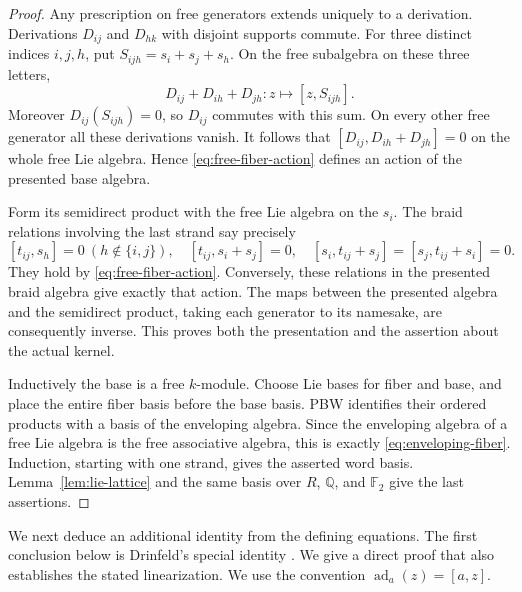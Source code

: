 \documentclass[11pt]{article}
\theoremstyle{definition}
\theoremstyle{remark}
\numberwithin{equation}{section}
\begin{document}
\begin{proof}
Any prescription on free generators extends uniquely to a derivation.
Derivations \(D_{ij}\) and \(D_{hk}\) with disjoint supports commute.
For three distinct indices \(i,j,h\), put
\(S_{ijh}=s_i+s_j+s_h\).  On the free subalgebra on these three letters,
\[
 D_{ij}+D_{ih}+D_{jh}:z\longmapsto[z,S_{ijh}].
\]
Moreover \(D_{ij}(S_{ijh})=0\), so \(D_{ij}\) commutes with this sum.
On every other free generator all these derivations vanish.  It
follows that \([D_{ij},D_{ih}+D_{jh}]=0\) on the whole free Lie
algebra.  Hence \eqref{eq:free-fiber-action} defines an action of the
presented base algebra.

Form its semidirect product with the free Lie algebra on the \(s_i\).
The braid relations involving the last strand say precisely
\[
 [t_{ij},s_h]=0\ (h\notin\{i,j\}),\quad
 [t_{ij},s_i+s_j]=0,\quad
 [s_i,t_{ij}+s_j]=[s_j,t_{ij}+s_i]=0.
\]
They hold by \eqref{eq:free-fiber-action}.  Conversely, these relations
in the presented braid algebra give exactly that action.  The maps
between the presented algebra and the semidirect product, taking each
generator to its namesake, are consequently inverse.  This proves
both the presentation and the assertion about the actual kernel.

Inductively the base is a free \(k\)-module.  Choose Lie bases for
fiber and base, and place the entire fiber basis before the base
basis.  PBW identifies their ordered products with a basis of the
enveloping algebra.  Since the enveloping algebra of a free Lie
algebra is the free associative algebra, this is exactly
\eqref{eq:enveloping-fiber}.  Induction, starting with one strand,
gives the asserted word basis.  Lemma~\ref{lem:lie-lattice} and the
same basis over \(R\), \(\mathbb Q\), and \({\mathbb F_2}\) give the last assertions.
\end{proof}

We next deduce an additional identity from the defining equations.
The first conclusion below is Drinfeld's special identity
\cite[Proposition~5.7]{Drinfeld}.  We give a direct proof that also
establishes the stated linearization.  We use the convention
\(\operatorname{ad}_a(z)=[a,z]\).
\end{document}
